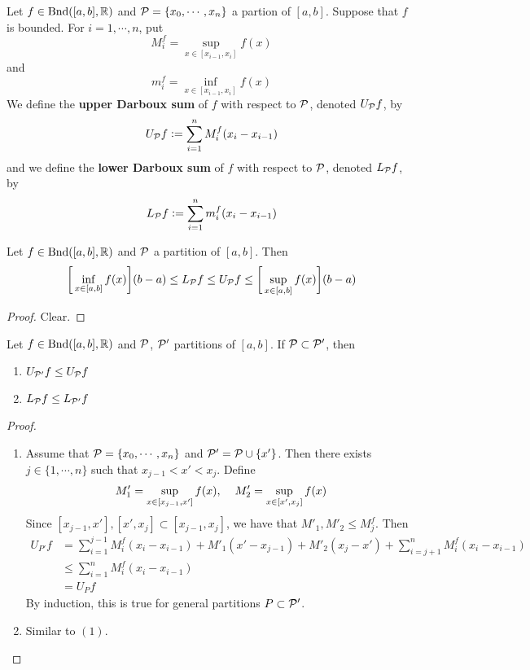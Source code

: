 \documentclass{book}
\begin{document}
	\begin{defn}  
		Let $f \in \text{Bnd}([a,b], \mathbb{R})$ and $\mathcal{P} = \{x_0, \cdots, x_n\}$ a partion of $[a,b]$. Suppose that $f$ is bounded. For $i = 1, \cdots, n$, put 
		$$M^f_i = \sup\limits_{x \in [x_{i-1}, x_i]} f(x)$$ and 
		$$m^f_i = \inf_{x \in [x_{i-1}, x_i]} f(x)$$ 
		We define the \textbf{upper Darboux sum} of $f$ with respect to $\mathcal{P}$, denoted $U_{\mathcal{P}} f$, by 
		$$U_{\mathcal{P}} f \vcentcolon= \sum\limits_{i=1}^n M^f_i (x_i - x_{i-1})$$ 
		and we define the \textbf{lower Darboux sum} of $f$ with respect to $\mathcal{P}$, denoted $L_{\mathcal{P}} f$, by
		$$L_{\mathcal{P}} f \vcentcolon= \sum\limits_{i=1}^n m^f_i (x_i - x_{i-1})$$ 
	\end{defn}

	\begin{ex}  
		Let $f \in \text{Bnd}([a,b], \mathbb{R})$ and $\mathcal{P}$ a partition of $[a,b]$. Then $$\bigg[\inf_{x \in [a,b]} f(x) \bigg] (b-a) \leq L_{\mathcal{P}} f \leq U_{\mathcal{P}} f \leq \bigg[ \sup\limits_{x \in [a,b]} f(x)  \bigg] (b-a)$$
	\end{ex}

	\begin{proof}
		Clear.
	\end{proof}

	\begin{ex}  
			Let $f \in \text{Bnd}([a,b], \mathbb{R})$ and $\mathcal{P}$, $\mathcal{P}'$ partitions of $[a,b]$. If $\mathcal{P} \subset \mathcal{P}'$, then 
			\begin{enumerate}
				\item $U_{\mathcal{P}'} f \leq U_{\mathcal{P}} f$
				\item $L_{\mathcal{P}} f \leq L_{\mathcal{P}'} f$
			\end{enumerate}
	\end{ex}

	\begin{proof} \
		\begin{enumerate}
			\item Assume that $\mathcal{P} = \{x_0, \cdots, x_n\}$ and $\mathcal{P}' = \mathcal{P} \cup \{x'\}$. Then there exists $j \in \{1, \cdots, n\}$ such that $x_{j-1} < x' < x_j$. Define $$M'_1 = \sup\limits_{x \in [x_{j-1}, x']} f(x), \hspace{.4cm} M'_2 = \sup\limits_{x \in [x', x_{j}]} f(x)$$
			Since $[x_{j-1}, x'], [x', x_j] \subset [x_{j-1}, x_j]$, we have that $M'_1, M'_2 \leq  M^f_j$. Then 
			\begin{align*}
				U_{P'}f 
				&= \sum\limits_{i =1}^{j-1} M^f_i(x_i - x_{i-1}) + M'_1(x' - x_{j-1}) + M'_2(x_j - x') + \sum\limits_{i =j+1}^n M^f_i(x_i - x_{i-1})  \\
				&\leq   \sum\limits_{i =1}^{n} M^f_i(x_i - x_{i-1}) \\
				&= U_P f 
			\end{align*}
			By induction, this is true for general partitions $P \subset \mathcal{P}'$.
			\item Similar to $(1)$.
		\end{enumerate}
	\end{proof}
\end{document}
